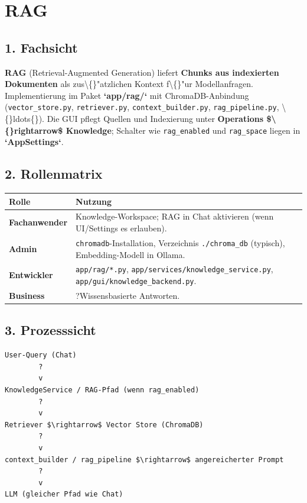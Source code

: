 \section{RAG}

\subsection{1. Fachsicht}

\textbf{RAG} (Retrieval-Augmented Generation) liefert \textbf{Chunks aus indexierten Dokumenten} als zus\textbackslash\{\}"atzlichen Kontext f\textbackslash\{\}"ur Modellanfragen. Implementierung im Paket \textbf{`app/rag/`} mit ChromaDB-Anbindung (\texttt{vector\_store.py}, \texttt{retriever.py}, \texttt{context\_builder.py}, \texttt{rag\_pipeline.py}, \textbackslash\{\}ldots\{\}). Die GUI pflegt Quellen und Indexierung unter \textbf{Operations \$\textbackslash\{\}rightarrow\$ Knowledge}; Schalter wie \texttt{rag\_enabled} und \texttt{rag\_space} liegen in \textbf{`AppSettings`}.

\subsection{2. Rollenmatrix}

\begin{center}
\begin{tabular}{ll}
\hline
Rolle & Nutzung \\
\hline
\textbf{Fachanwender} & Knowledge-Workspace; RAG in Chat aktivieren (wenn UI/Settings es erlauben). \\
\textbf{Admin} & \texttt{chromadb}-Installation, Verzeichnis \texttt{./chroma\_db} (typisch), Embedding-Modell in Ollama. \\
\textbf{Entwickler} & \texttt{app/rag/*.py}, \texttt{app/services/knowledge\_service.py}, \texttt{app/gui/knowledge\_backend.py}. \\
\textbf{Business} & ?Wissensbasierte Antworten\texttt{}. \\
\hline
\end{tabular}
\end{center}

\subsection{3. Prozesssicht}

\begin{verbatim}
User-Query (Chat)
        ?
        v
KnowledgeService / RAG-Pfad (wenn rag_enabled)
        ?
        v
Retriever $\rightarrow$ Vector Store (ChromaDB)
        ?
        v
context_builder / rag_pipeline $\rightarrow$ angereicherter Prompt
        ?
        v
LLM (gleicher Pfad wie Chat)
\end{verbatim}

